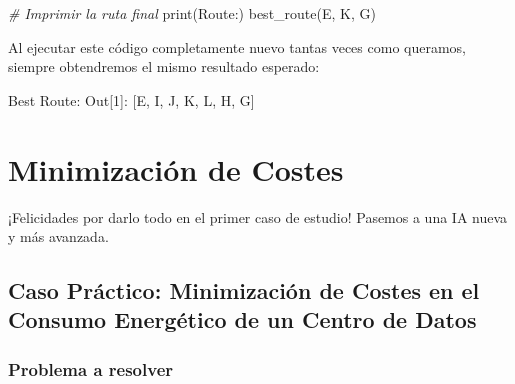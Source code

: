 \documentclass[
]{book}
\newenvironment{Shaded}{\begin{snugshade}}{\end{snugshade}}
\newcommand{\BuiltInTok}[1]{#1}
\newcommand{\CommentTok}[1]{\textcolor[rgb]{0.56,0.35,0.01}{\textit{#1}}}
\newcommand{\DecValTok}[1]{\textcolor[rgb]{0.00,0.00,0.81}{#1}}
\newcommand{\NormalTok}[1]{#1}
\newcommand{\StringTok}[1]{\textcolor[rgb]{0.31,0.60,0.02}{#1}}
\begin{document}
\begin{Shaded}
\begin{Highlighting}[]
\CommentTok{\# Imprimir la ruta final}
\BuiltInTok{print}\NormalTok{(}\StringTok{\textquotesingle{}Route:\textquotesingle{}}\NormalTok{)}
\NormalTok{best\_route(}\StringTok{\textquotesingle{}E\textquotesingle{}}\NormalTok{, }\StringTok{\textquotesingle{}K\textquotesingle{}}\NormalTok{, }\StringTok{\textquotesingle{}G\textquotesingle{}}\NormalTok{)}
\end{Highlighting}
\end{Shaded}

Al ejecutar este código completamente nuevo tantas veces como queramos, siempre obtendremos el mismo resultado esperado:

\begin{Shaded}
\begin{Highlighting}[]
\NormalTok{Best Route:}
\NormalTok{Out[}\DecValTok{1}\NormalTok{]: [}\StringTok{\textquotesingle{}E\textquotesingle{}}\NormalTok{, }\StringTok{\textquotesingle{}I\textquotesingle{}}\NormalTok{, }\StringTok{\textquotesingle{}J\textquotesingle{}}\NormalTok{, }\StringTok{\textquotesingle{}K\textquotesingle{}}\NormalTok{, }\StringTok{\textquotesingle{}L\textquotesingle{}}\NormalTok{, }\StringTok{\textquotesingle{}H\textquotesingle{}}\NormalTok{, }\StringTok{\textquotesingle{}G\textquotesingle{}}\NormalTok{]}
\end{Highlighting}
\end{Shaded}

\hypertarget{minimizaciuxf3n-de-costes}{%
\chapter{Minimización de Costes}\label{minimizaciuxf3n-de-costes}}

¡Felicidades por darlo todo en el primer caso de estudio! Pasemos a una IA nueva y más avanzada.

\hypertarget{caso-pruxe1ctico-minimizaciuxf3n-de-costes-en-el-consumo-energuxe9tico-de-un-centro-de-datos}{%
\section{Caso Práctico: Minimización de Costes en el Consumo Energético de un Centro de Datos}\label{caso-pruxe1ctico-minimizaciuxf3n-de-costes-en-el-consumo-energuxe9tico-de-un-centro-de-datos}}

\hypertarget{problema-a-resolver-1}{%
\subsection{Problema a resolver}\label{problema-a-resolver-1}}
\end{document}
